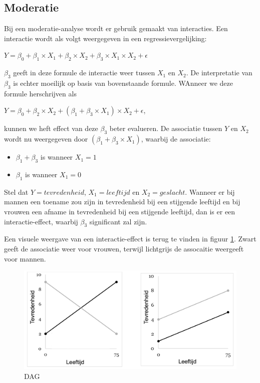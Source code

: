 \documentclass[
]{book}
\providecommand{\tightlist}{%
  \setlength{\itemsep}{0pt}\setlength{\parskip}{0pt}}
\theoremstyle{definition}
\theoremstyle{definition}
\theoremstyle{definition}
\theoremstyle{definition}
\theoremstyle{remark}
\begin{document}
\hypertarget{moderatie}{%
\subsection*{Moderatie}\label{moderatie}}


Bij een moderatie-analyse wordt er gebruik gemaakt van interacties. Een interactie wordt als volgt weergegeven in een regressievergelijking:

\(Y = \beta_0 + \beta_1 \times X_1 + \beta_2 \times X_2 + \beta_3 \times X_1 \times X_2 + \epsilon\)

\(\beta_3\) geeft in deze formule de interactie weer tussen \(X_1\) en \(X_2\). De interpretatie van \(\beta_3\) is echter moeilijk op basis van bovenstaande formule. WAnneer we deze formule herschrijven als

\(Y = \beta_0 + \beta_2 \times X_2 + (\beta_1 + \beta_3 \times X_1) \times X_2 + \epsilon\),

kunnen we heft effect van deze \(\beta_3\) beter evalueren. De associatie tussen \(Y\) en \(X_2\) wordt nu weergegeven door \((\beta_1 + \beta_3 \times X_1)\), waarbij de associatie:

\begin{itemize}
\tightlist
\item
  \(\beta_1 + \beta_3\) is wanneer \(X_1 = 1\)
\item
  \(\beta_1\) is wanneer \(X_1 = 0\)
\end{itemize}

Stel dat \(Y = tevredenheid\), \(X_1 = leeftijd\) en \(X_2 = geslacht\). Wanneer er bij mannen een toename zou zijn in tevredenheid bij een stijgende leeftijd en bij vrouwen een afname in tevredenheid bij een stijgende leeftijd, dan is er een interactie-effect, waarbij \(\beta_3\) significant zal zijn.

Een visuele weergave van een interactie-effect is terug te vinden in figuur \ref{fig:int1}. Zwart geeft de associatie weer voor vrouwen, terwijl lichtgrijs de assocaitie weergeeft voor mannen.

\begin{figure}
\includegraphics[width=0.75\linewidth]{img/interactie1} \caption{DAG}\label{fig:int1}
\end{figure}
\end{document}
